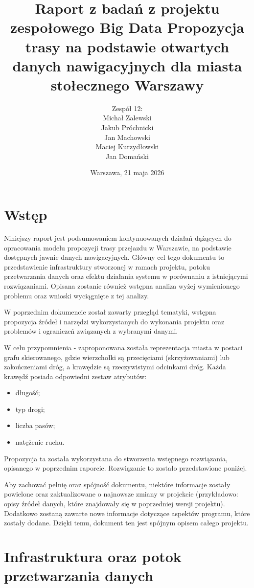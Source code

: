\documentclass[12pt]{article}
\title{\textbf{Raport z badań z projektu zespołowego Big Data
\newline
\newline
Propozycja trasy na podstawie otwartych danych nawigacyjnych dla miasta stołecznego Warszawy}}
\author{Zespół 12: \\ Michał Zalewski \\ Jakub Próchnicki \\ Jan Machowski \\ Maciej Kurzydłowski \\ Jan Domański}
\date{Warszawa, 21 maja 2026}
\begin{document}
\maketitle
\newpage
\tableofcontents
\newpage




\section{Wstęp}

Niniejszy raport jest podsumowaniem kontynuowanych działań dążących do opracowania modelu propozycji trasy przejazdu w Warszawie,
na podstawie dostępnych jawnie danych nawigacyjnych. Główny cel tego dokumentu to przedstawienie infrastruktury stworzonej w ramach projektu, 
potoku przetwarzania danych oraz efektu działania systemu w porównaniu z istniejącymi rozwiązaniami. Opisana zostanie również wstępna analiza
wyżej wymienionego problemu oraz wnioski wyciągnięte z tej analizy.

W poprzednim dokumencie został zawarty przegląd tematyki, wstępna propozycja źródeł i narzędzi 
wykorzystanych do wykonania projektu oraz problemów i ograniczeń związanych z wybranymi danymi.

W celu przypomnienia - zaproponowana została reprezentacja miasta w postaci grafu skierowanego, 
gdzie wierzchołki są przecięciami (skrzyżowaniami) lub zakończeniami dróg, a krawędzie
są rzeczywistymi odcinkami dróg. Każda krawędź posiada odpowiedni zestaw atrybutów:
\begin{itemize}
    \item długość;
    \item typ drogi;
    \item liczba pasów;
    \item natężenie ruchu.
\end{itemize} 
Propozycja ta została wykorzystana do stworzenia wstępnego rozwiązania, opisanego w poprzednim raporcie. 
Rozwiązanie to zostało przedstawione poniżej.

Aby zachować pełnię oraz spójność dokumentu, niektóre informacje zostały powielone oraz zaktualizowane o najnowsze zmiany w projekcie
(przykładowo: opisy źródeł danych, które znajdowały się w poprzedniej wersji projektu). Dodatkowo zostaną zawarte nowe informacje dotyczące 
aspektów programu, które zostały dodane. Dzięki temu, dokument ten jest spójnym opisem całego projektu.



\section{Infrastruktura oraz potok przetwarzania danych}
\end{document}
